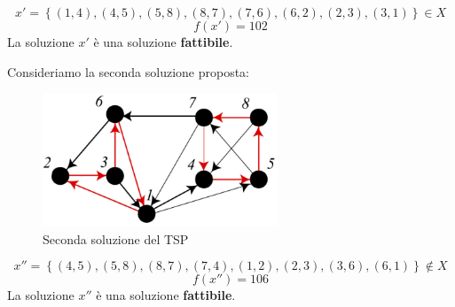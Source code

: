 \documentclass{article}
\begin{document}
$$x'=\left\{(1,4),(4,5),(5,8),(8,7),(7,6),(6,2),(2,3),(3,1)\right\}\in X$$
$$f(x')=102$$
La soluzione $x'$ è una soluzione \textbf{fattibile}.

Consideriamo la seconda soluzione proposta:
\begin{figure}[H]
    \centering
    \includegraphics[width=7cm]{images/TSP_sol2.png}
    \caption{Seconda soluzione del TSP}
    \label{fig:tsp_2_sol}
\end{figure}
$$x''=\left\{(4,5),(5,8),(8,7),(7,4),(1,2),(2,3),(3,6),(6,1)\right\}\notin X$$
$$f(x'')=106$$
La soluzione $x''$ è una soluzione \textbf{fattibile}.
\end{document}
